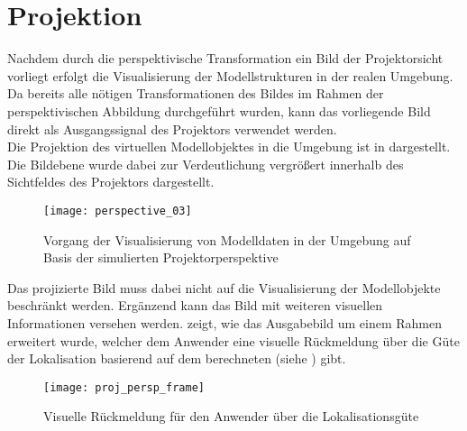\section{Projektion}
\label{chap.projection}
Nachdem durch die perspektivische Transformation ein Bild der Projektorsicht vorliegt erfolgt die Visualisierung der Modellstrukturen in der realen Umgebung. Da bereits alle nötigen Transformationen des Bildes im Rahmen der perspektivischen Abbildung durchgeführt wurden, kann das vorliegende Bild direkt als Ausgangssignal des Projektors verwendet werden.\\
Die Projektion des virtuellen Modellobjektes in die Umgebung ist in  dargestellt. 
Die Bildebene wurde dabei zur Verdeutlichung vergrößert innerhalb des Sichtfeldes des Projektors dargestellt. 

\begin{figure}[!ht]
	\begin{center}
		\texttt{[image: perspective\_03]}
		\caption{Vorgang der Visualisierung von Modelldaten in der Umgebung auf Basis der simulierten Projektorperspektive}
		\label{fig.perspproj}
	\end{center}
\end{figure}

Das projizierte Bild muss dabei nicht auf die Visualisierung der Modellobjekte beschränkt werden. Ergänzend kann das Bild mit weiteren visuellen Informationen versehen werden.  zeigt, wie das Ausgabebild um einem Rahmen erweitert wurde, welcher dem Anwender eine visuelle Rückmeldung über die Güte der Lokalisation basierend auf dem berechneten  (siehe ) gibt.\\


\begin{figure}[!ht]
	\begin{center}
		\texttt{[image: proj\_persp\_frame]}
		\caption{Visuelle Rückmeldung für den Anwender über die Lokalisationsgüte}
		\label{fig.proj_rms}
	\end{center}
\end{figure}

